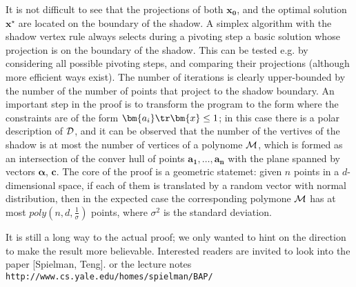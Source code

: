 \noindent
It is not difficult to see that the projections of both  $\bm{x_0}$, and the optimal solution  $\bm{x^\star}$
are located on the boundary of the shadow. A simplex algorithm with the shadow vertex rule 
always selects during a pivoting step a basic solution whose projection  is on the boundary of the shadow. 
This can be tested
e.g. by considering all possible pivoting steps, and comparing their projections (although more efficient
ways exist). The number of iterations is clearly upper-bounded by the number of 
the number of points that project to the shadow boundary. An important step in the proof is to transform
the program to the form where the constraints are of the form $\bm{a_i}\tr\bm{x}\le1$;
in this case there is a polar description of $\cal D$, and it can be observed that the number of the
vertives of the shadow is at most the number of vertices of a polynome $\cal M$, which is formed
as an intersection of the conver hull of points $\bm{a_1},\ldots,\bm{a_n}$ with the plane spanned
by vectors $\bm{\alpha}$, $\bm{c}$.
The core of the proof is a geometric statemet: given $n$ points in a $d$-dimensional space, if each 
of them is translated by a random vector with normal distribution, then in the expected case 
the corresponding polymone $\cal M$ has at most $poly(n,d,\frac{1}{\sigma})$ points, where $\sigma^2$
is the standard deviation.

\noindent
It is still a long way to the actual proof; we only wanted to hint on the direction to make the result more
believable. Interested readers are invited to look into the paper [Spielman, Teng]. or the 
lecture notes
{\tt http://www.cs.yale.edu/homes/spielman/BAP/}

